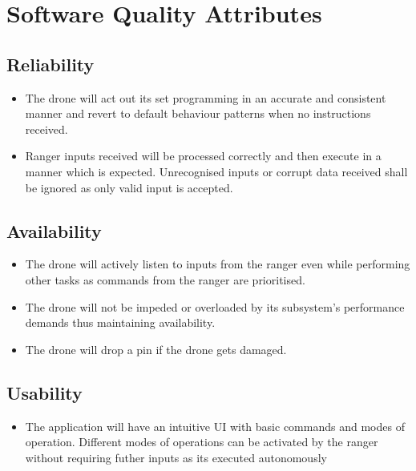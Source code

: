 \section{Software Quality Attributes}
\subsection {Reliability}
\begin{itemize}
	\item The drone will act out its set programming in an accurate and consistent manner and revert to default behaviour patterns when no instructions received.  
	\item Ranger inputs received will be processed correctly and then execute in a manner which is expected. Unrecognised inputs or corrupt data received shall be ignored as only valid input is accepted.
\end{itemize}

\subsection {Availability}
\begin{itemize}
	\item The drone will actively listen to inputs from the ranger even while performing other tasks as commands from the ranger are prioritised. 
	\item The drone will not be impeded or overloaded by its subsystem's performance demands thus maintaining availability. 
	\item The drone will drop a pin if the drone gets damaged. 
\end{itemize}

\subsection {Usability}
\begin{itemize}
	\item The application will have an intuitive UI with basic commands and modes of operation. Different modes of operations can be activated  by the ranger without requiring futher inputs as its executed autonomously 
\end{itemize}


